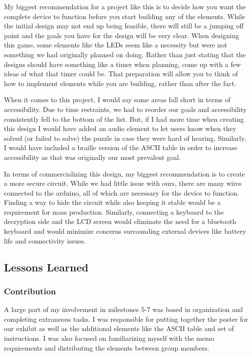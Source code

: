 \documentclass[conference]{IEEEtran}
\begin{document}
\par My biggest recommendation for a project like this is to decide how you want the complete device to function before you start building any of the elements. While the initial design may not end up being feasible, there will still be a jumping off point and the goals you have for the design will be very clear. When designing this game, some elements like the LEDs seem like a necessity but were not something we had originally planned on doing. Rather than just stating that the designs should have something like a timer when planning, come up with a few ideas of what that timer could be. That preparation will allow you to think of how to implement elements while you are building, rather than after the fact. 
\par    When it comes to this project, I would say some areas fall short in terms of accessibility. Due to time restraints, we had to reorder our goals and accessibility consistently fell to the bottom of the list. But, if I had more time when creating this design I would have added an audio element to let users know when they solved (or failed to solve) the puzzle in case they were hard of hearing. Similarly, I would have included a braille version of the ASCII table in order to increase accessibility as that was originally our most prevalent goal. 
\par In terms of commercializing this design, my biggest recommendation is to create a more secure 
circuit. While we had little issue with ours, there are many wires connected to the arduino, all of which are necessary for the device to function. Finding a way to hide the circuit while also keeping it stable would be a requirement for mass production. Similarly, connecting a keyboard to the decryption side and the LCD screen would eliminate the need for a bluetooth keyboard and would minimize concerns surrounding external devices like battery life and connectivity issues. 

\subsection{Lessons Learned}

\subsubsection{Contribution}

\par A large part of my involvement in milestones 5-7 was based in organization and completing extraneous tasks. I was responsible for putting together the poster for our exhibit as well as the additional elements like the ASCII table and set of instructions. I was also focused on familiarizing myself with the memo requirements and distributing the elements between group members. 
\end{document}
